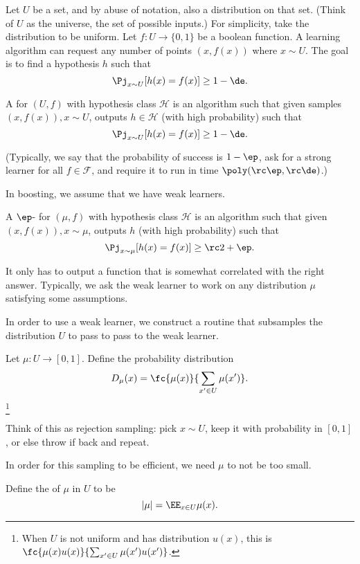 Let $U$ be a set, and by abuse of notation, also a distribution on that set. (Think of $U$ as the universe, the set of possible inputs.) For simplicity, take the distribution to be uniform.
Let $f:U\to \{0,1\}$ be a boolean function.
A learning algorithm can request any number of points $(x,f(x))$ where $x\sim U$. The goal is to find a hypothesis $h$ such that 
$$
\Pj_{x\sim U} [h(x)=f(x)]\ge 1-\de.
$$
\begin{thm}
A  for $(U,f)$ with hypothesis class $\mathcal H$ is an algorithm such that given samples $(x,f(x)), x\sim U$, outputs $h\in \mathcal H$ (with high probability) such that 
$$\Pj_{x\sim U}[h(x)=f(x)]\ge 1-\de.$$

(Typically, we say that the probability of success is $1-\ep$, ask for a strong learner for all $f\in \mathcal F$, and require it to run in time $\poly(\rc \ep, \rc \de)$.) 
\end{thm}

In boosting, we assume that we have weak learners.
\begin{thm}
A $\ep$- for $(\mu, f)$ with hypothesis class $\mathcal H$ is an algorithm such that given $(x,f(x)), x\sim \mu$, outputs $h$ (with high probability) such that
$$
\Pj_{x\sim \mu} [h(x)=f(x)] \ge \rc 2+\ep.
$$
\end{thm}
It only has to output a function that is somewhat correlated with the right answer.
Typically, we ask the weak learner to work on any distribution $\mu$ satisfying some assumptions.

In order to use a weak learner, we construct a routine that subsamples the distribution $U$ to pass to pass to the weak learner.
\begin{df}
Let $\mu:U\to [0,1]$. Define the probability distribution 
$$
D_\mu(x) = \fc{\mu(x)}{\sum_{x'\in U}\mu(x')}.
$$
\footnote{When $U$ is not uniform and has distribution $u(x)$, this is $\fc{\mu(x)u(x)}{\sum_{x'\in U} \mu(x')u(x')}$.}
\end{df}
Think of this as rejection sampling: pick $x\sim U$, keep it with probability in $[0,1]$, or else throw if back and repeat.

In order for this sampling to be efficient, we need $\mu$ to not be too small.
\begin{df}
Define the  of $\mu$ in $U$ to be
$$|\mu| = \EE_{x\in U} \mu(x).$$ 
\end{df}

